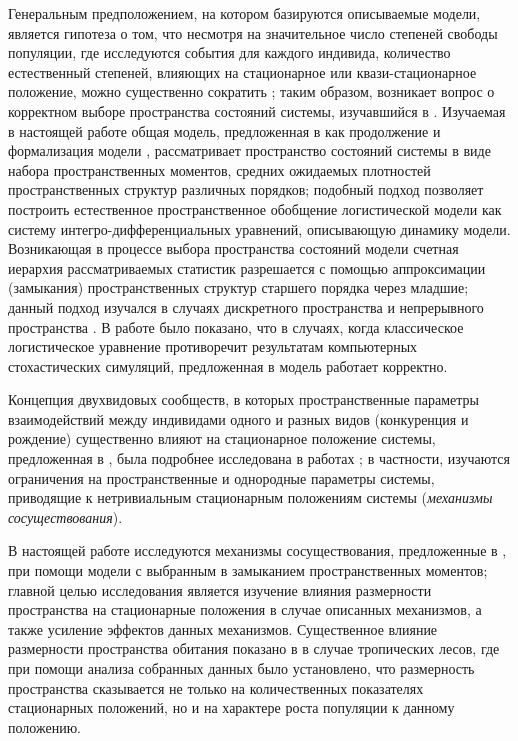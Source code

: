 Генеральным предположением, на котором базируются описываемые модели, является гипотеза о том, что несмотря на значительное число степеней свободы популяции, где исследуются события для каждого индивида, количество естественный степеней, влияющих на стационарное или квази-стационарное положение, можно существенно сократить \cite{RAND}; таким образом, возникает вопрос о корректном выборе пространства состояний системы, изучавшийся в \cite{WEINS1993,Hastings1994,Levin334}. Изучаемая в настоящей работе общая модель, предложенная в \cite{law_dieckmann_2000} как продолжение и формализация модели \cite{BOLKER1997179}, рассматривает пространство состояний системы в виде набора пространственных моментов, средних ожидаемых плотностей пространственных структур различных порядков; подобный подход позволяет построить естественное пространственное обобщение логистической модели \cite{ferh} как систему интегро-дифференциальных уравнений, описывающую динамику модели. Возникающая в процессе выбора пространства состояний модели счетная иерархия рассматриваемых статистик разрешается с помощью аппроксимации (замыкания) пространственных структур старшего порядка через младшие; данный подход изучался в случаях дискретного пространства  \cite{MATS,RAND1999,baalen_2000} и непрерывного пространства \cite{law_dieckmann_2000,Filipe200315}. В работе \cite{law_2003} было показано, что в случаях, когда классическое логистическое уравнение противоречит результатам компьютерных стохастических симуляций, предложенная в \cite{law_dieckmann_2000} модель работает корректно.

Концепция двухвидовых сообществ, в которых пространственные параметры взаимодействий между индивидами одного и разных видов (конкуренция и рождение) существенно влияют на стационарное положение системы, предложенная в \cite{law_2003}, была подробнее исследована в работах \cite{MURRELL,velazquez}; в частности, изучаются ограничения на пространственные и однородные параметры системы, приводящие к нетривиальным стационарным положениям системы (\textit{механизмы сосуществования}).

В настоящей работе исследуются механизмы сосуществования, предложенные в \cite{MURRELL}, при помощи модели \cite{law_dieckmann_2000} с выбранным в \cite{law_2003} замыканием пространственных моментов; главной целью исследования является изучение влияния размерности пространства на стационарные положения в случае описанных механизмов, а также усиление эффектов данных механизмов. Существенное влияние размерности пространства обитания показано в \cite{Pawar2012a} в случае тропических лесов, где при помощи анализа собранных данных было установлено, что размерность пространства сказывается не только на количественных показателях стационарных положений, но и на характере роста популяции к данному положению.

